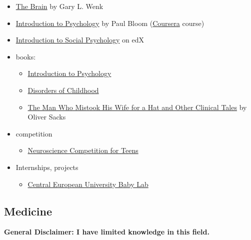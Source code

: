 \documentclass{article}
\begin{document}
\begin{itemize}
    \item \href{https://www.goodreads.com/book/show/34107392-the-brain}{The Brain} by Gary L. Wenk
    \item \href{https://www.youtube.com/playlist?list=PL6A08EB4EEFF3E91F}{Introduction to Psychology} by Paul Bloom (\href{https://www.coursera.org/learn/introduction-psychology}{Coursera} course)
    \item \href{https://www.edx.org/course/introduction-to-social-psychology}{Introduction to Social Psychology} on edX
   \item books:
   \begin{itemize}
        \item \href{https://www.goodreads.com/book/show/10514920-introduction-to-psychology}{Introduction to Psychology}
       \item \href{https://www.goodreads.com/en/book/show/16242266-disorders-of-childhood}{Disorders of Childhood}
       \item \href{https://www.goodreads.com/book/show/63697.The_Man_Who_Mistook_His_Wife_for_a_Hat_and_Other_Clinical_Tales}{The Man Who Mistook His Wife for a Hat and Other Clinical Tales} by Oliver Sacks
   \end{itemize}
   \item competition
   \begin{itemize}
       \item \href{https://thebrainbee.org/}{Neuroscience Competition for Teens}
   \end{itemize}
    \item Internships, projects
    \begin{itemize}
        \item \href{https://cognitivescience.ceu.edu/unit/baby-lab}{Central European University Baby Lab}
    \end{itemize}
\end{itemize}

\subsection{Medicine}
\textbf{General Disclaimer: I have limited knowledge in this field.}
\end{document}
